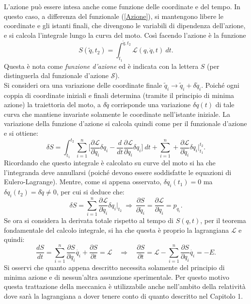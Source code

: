 L'azione può essere intesa anche come funzione delle coordinate e del tempo. In questo caso, a differenza del funzionale (\ref{Azione}), si mantengono libere le coordinate e gli istanti finali, che divengono le variabili di dipendenza dell'azione, e si calcola l'integrale lungo la curva del moto. Così facendo l'azione è la funzione
\begin{equation}
    S (\tilde q,t_2)=\int_{t_1}^{\tilde q,t_2} \mathcal{L} (q,\dot q,t)\ dt.
\end{equation}
Questa è nota come \emph{funzione d'azione} ed è indicata con la lettera $S$ (per distinguerla dal funzionale d'azione $\mathcal{S} $).\\
Si consideri ora una variazione delle coordinate finale $\tilde q_i\rightarrow \tilde q_i+\delta \tilde q_i$. Poiché ogni coppia di coordinate iniziali e finali determina (tramite il principio di minima azione) la traiettoria del moto, a $\delta \tilde q$ corrisponde una variazione $\delta q(t)$ di tale curva che mantiene invariate solamente le coordinate nell'istante iniziale. La variazione della funzione d'azione si calcola quindi come per il funzionale d'azione e si ottiene:
\begin{equation*}
    \delta S=\int_{t_1}^{t_2}\sum_{i=1}^{n}\bigg[\frac{\partial\mathcal{L} }{\partial \dot  q_i}\delta q_i-\frac{d}{dt}\frac{\partial\mathcal{L} }{\partial \dot{q}_i}\delta q_i \bigg]\ dt+\sum_{i=1}^n+\frac{\partial\mathcal{L} }{\partial \dot q_i}\delta q_i\bigg|_{t_1}^{t_2}.
\end{equation*}
Ricordando che questo integrale è calcolato su curve del moto si ha che l'integranda deve annullarsi (poiché devono essere soddisfatte le equazioni di Eulero-Lagrange). Mentre, come si appena osservato, $\delta q_i(t_1)=0$ ma $\delta q_i(t_2)=\delta \tilde q\neq0$, per cui si deduce che:
\begin{equation*}
    \delta S=\sum_{i=1}^n\frac{\partial\mathcal{L} }{\partial \dot q_i}\delta q_i\bigg|_{t_2}\ \Rightarrow\ \frac{\partial S}{\partial \tilde q_i}= \frac{\partial\mathcal{L} }{\partial \dot q_i}=p_{q_i}.
\end{equation*}
Se ora si considera la derivata totale rispetto al tempo di $S(q,t)$, per il teorema fondamentale del calcolo integrale, si ha che questa è proprio la lagrangiana $\mathcal{L} $ e quindi:
\begin{equation*}
    \frac{dS}{dt}=\sum_{i=1}^n\frac{\partial S }{\partial  q_i}\dot{q_i}+\frac{\partial S }{\partial t}=\mathcal{L}\quad \Rightarrow\quad \frac{\partial S }{\partial t}=\mathcal{L} -\sum_{i=1}^n\frac{\partial S }{\partial  q_i}\dot{q_i}=-E.
\end{equation*} 
Si osservi che quanto appena descritto necessita solamente del principio di minima azione e di nessun'altra assunzione sperimentale. Per questo motivo questa trattazione della meccanica è utilizzabile anche nell'ambito della relatività dove sarà la lagrangiana a dover tenere conto di quanto descritto nel Capitolo 1.